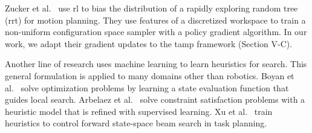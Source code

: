 Zucker et al.~\cite{workspacebias} use {\sc rl} to bias the
distribution of a rapidly exploring random tree ({\sc rrt}) for motion
planning. They use features of a discretized workspace to train a
non-uniform configuration space sampler with a policy gradient
algorithm.  In our work, we adapt their gradient updates to the {\sc
  tamp} framework (Section V-C).

Another line of research uses machine learning to learn heuristics for
search. This general formulation is applied to many domains other than
robotics.  Boyan et al.~\cite{Boyanlearning} solve optimization
problems by learning a state evaluation function that guides local
search. Arbelaez et al.~\cite{hamadisearch} solve constraint
satisfaction problems with a heuristic model that is refined with
supervised learning.  Xu et al.~\cite{Xu07discriminativelearning}
train heuristics to control forward state-space beam search in task
planning.
